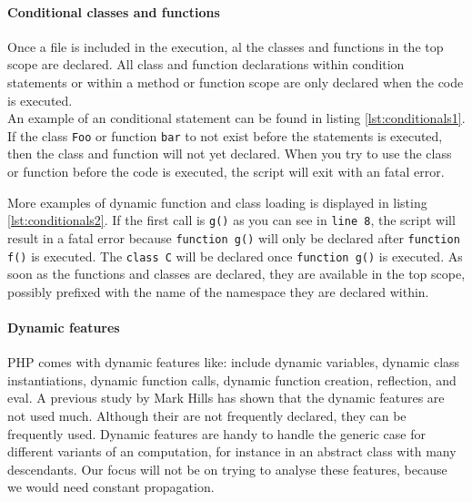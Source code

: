 \documentclass[../main.tex]{subfiles}
\begin{document}
    \paragraph{Conditional classes and functions}
    Once a file is included in the execution, al the classes and functions in the top scope are declared.
    All class and function declarations within condition statements or within a method or function scope are only declared when the code is executed.
    \\
    An example of an conditional statement can be found in listing \ref{lst:conditionals1}.
    If the class \texttt{Foo} or function \texttt{bar} to not exist before the statements is executed, then the class and function will not yet declared. 
    When you try to use the class or function before the code is executed, the script will exit with an fatal error.

    

    More examples of dynamic function and class loading is displayed in listing \ref{lst:conditionals2}.
    If the first call is \texttt{g()} as you can see in \texttt{line 8}, the script will result in a fatal error because \texttt{function g()} will only be declared after \texttt{function f()} is executed.
    The \texttt{class C} will be declared once \texttt{function g()} is executed.
    As soon as the functions and classes are declared, they are available in the top scope, possibly prefixed with the name of the namespace they are declared within.
    

    
    \paragraph{Dynamic features}
    PHP comes with dynamic features like: include dynamic variables, dynamic class instantiations, dynamic function calls, dynamic function creation, reflection, and eval.
    A previous study by Mark Hills\cite{Hil:13} has shown that the dynamic features are not used much.
    Although their are not frequently declared, they can be frequently used.
    Dynamic features are handy to handle the generic case for different variants of an computation, for instance in an abstract class with many descendants.
    Our focus will not be on trying to analyse these features, because we would need constant propagation.
    
\end{document}
